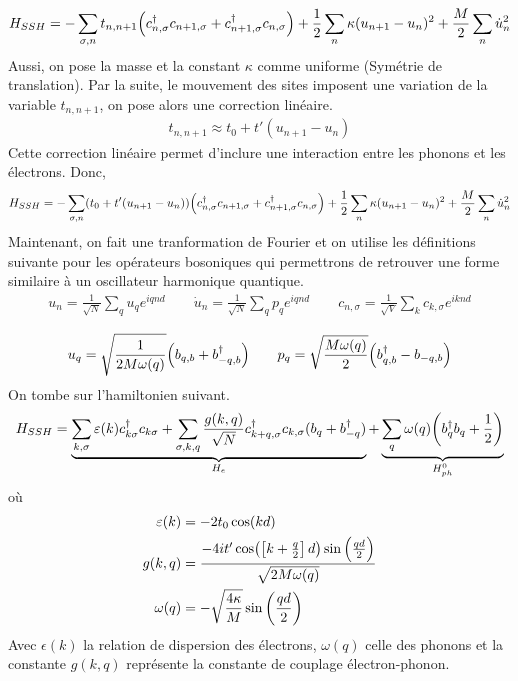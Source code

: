 \begin{align}
    H_{SSH} = -\sum_{\sigma,n} t_{n,n+1} \qty(c^\dagger_{n,\sigma}c_{n+1,\sigma} + c^\dagger_{n+1,\sigma}c_{n,\sigma} ) + \frac{1}{2}\sum_{n} \kappa (u_{n+1}-u_n)^2 + \frac{M}{2}\sum_n \dot{u}^2_n
\end{align}
Aussi, on pose la masse et la constant $\kappa$ comme uniforme (Symétrie de translation).  Par la suite, le mouvement des sites imposent une variation de la variable $t_{n,n+1}$, on pose alors une correction linéaire.
\begin{align}
    t_{n,n+1} \approx t_0 + t'(u_{n+1} - u_n)
\end{align}
Cette correction linéaire permet d'inclure une interaction entre les phonons et les électrons. Donc,
\begin{align}
    H_{SSH} = -\sum_{\sigma,n} (t_0 + t'(u_{n+1} - u_n))\qty(c^\dagger_{n,\sigma}c_{n+1,\sigma} + c^\dagger_{n+1,\sigma}c_{n,\sigma} )+ \frac{1}{2}\sum_{n} \kappa (u_{n+1}-u_n)^2 + \frac{M}{2}\sum_n \dot{u}^2_n
\end{align}
Maintenant, on fait une tranformation de Fourier et on utilise les définitions suivante pour les opérateurs bosoniques qui permettrons de retrouver une forme similaire à un oscillateur harmonique quantique.
\begin{align*}
    u_{n} =  \frac{1}{\sqrt{N}}\sum_{q}u_q e^{iqnd}\qquad\dot{u}_{n} =  \frac{1}{\sqrt{N}}\sum_{q}p_q e^{iqnd}\qquad  c_{n,\sigma} = \frac{1}{\sqrt{V}}\sum_k c_{k,\sigma} e^{iknd}\\
\end{align*}
\begin{align*}
    u_q = \sqrt{\frac{1}{2M\omega(q)}}\qty(b_{q,b}+b^\dagger_{-q,b})\qquad p_q =\sqrt{\frac{M\omega(q)}{2}}\qty(b_{q,b}^\dagger-b_{-q,b})\\
\end{align*}
On tombe sur l'hamiltonien suivant.
\begin{align}
    H_{SSH} = \underbrace{\sum_{k,\sigma}\varepsilon(k)c_{k\sigma}^\dagger c_{k\sigma} + \sum_{\sigma,k,q}\frac{g(k,q)}{\sqrt{N}} c^\dagger_{k+q,\sigma}c_{k,\sigma}(b_q+b^\dagger_{-q})}_{H_e} + \underbrace{\sum_q\omega(q)\qty(b^\dagger_qb_q+\frac{1}{2})}_{H_{ph}^0}
\end{align}
où
\begin{align}
    \varepsilon(k) &= -2t_0\cos(kd)\\
    g(k,q) &= \frac{-4it'\cos(\left[k+\frac{q}{2}\right]d)\sin\qty(\frac{qd}{2})}{\sqrt{2M\omega(q)}}\\
    \omega(q) &= -\sqrt{\frac{4\kappa}{M}} \sin\qty(\frac{qd}{2})
\end{align}
Avec $\epsilon(k)$ la relation de dispersion des électrons, $\omega(q)$ celle des phonons et la constante $g(k,q)$ représente la constante de couplage électron-phonon. 
